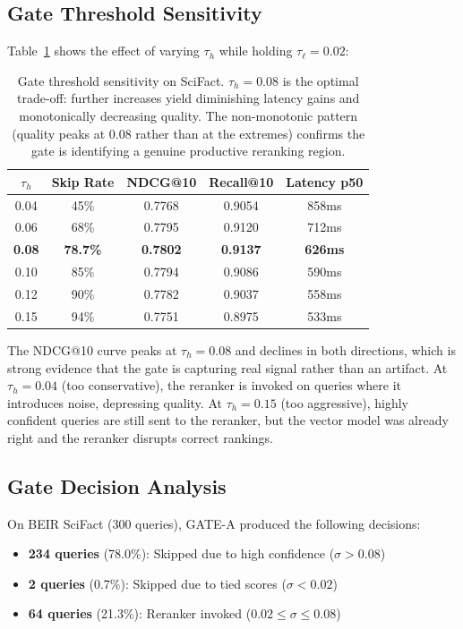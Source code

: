 \documentclass[11pt]{article}
\begin{document}
\subsection{Gate Threshold Sensitivity}
\label{sec:gate:sensitivity}

Table~\ref{tab:gate-sensitivity} shows the effect of varying $\tau_h$ while holding
$\tau_\ell = 0.02$:

\begin{table}[H]
\centering
\small
\begin{tabular}{ccccc}
\toprule
$\tau_h$ & Skip Rate & NDCG@10 & Recall@10 & Latency p50 \\
\midrule
0.04 & 45\% & 0.7768 & 0.9054 & 858ms \\
0.06 & 68\% & 0.7795 & 0.9120 & 712ms \\
\textbf{0.08} & \textbf{78.7\%} & \textbf{0.7802} & \textbf{0.9137} & \textbf{626ms} \\
0.10 & 85\% & 0.7794 & 0.9086 & 590ms \\
0.12 & 90\% & 0.7782 & 0.9037 & 558ms \\
0.15 & 94\% & 0.7751 & 0.8975 & 533ms \\
\bottomrule
\end{tabular}
\caption{Gate threshold sensitivity on SciFact. $\tau_h = 0.08$ is the optimal
trade-off: further increases yield diminishing latency gains and monotonically decreasing
quality. The non-monotonic pattern (quality peaks at 0.08 rather than at the extremes)
confirms the gate is identifying a genuine productive reranking region.}
\label{tab:gate-sensitivity}
\end{table}

The NDCG@10 curve peaks at $\tau_h = 0.08$ and declines in both directions, which is
strong evidence that the gate is capturing real signal rather than an artifact. At
$\tau_h = 0.04$ (too conservative), the reranker is invoked on queries where it
introduces noise, depressing quality. At $\tau_h = 0.15$ (too aggressive), highly
confident queries are still sent to the reranker, but the vector model was already
right and the reranker disrupts correct rankings.

\subsection{Gate Decision Analysis}

On BEIR SciFact (300 queries), GATE-A produced the following decisions:

\begin{itemize}[leftmargin=2em, itemsep=2pt]
  \item \textbf{234 queries} (78.0\%): Skipped due to high confidence ($\sigma > 0.08$)
  \item \textbf{2 queries} (0.7\%): Skipped due to tied scores ($\sigma < 0.02$)
  \item \textbf{64 queries} (21.3\%): Reranker invoked ($0.02 \leq \sigma \leq 0.08$)
\end{itemize}
\end{document}

